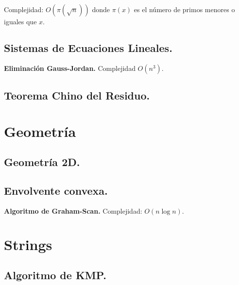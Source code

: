 \documentclass[10pt, letterpaper, twoside]{article}
\begin{document}
Complejidad: $O\left(\pi\left(\sqrt{n}\right)\right)$ donde $\pi(x)$ es el número de primos menores o iguales que $x$.



\subsection{Sistemas de Ecuaciones Lineales.}

\textbf{Eliminación Gauss-Jordan.} Complejidad $O(n^3)$.



\subsection{Teorema Chino del Residuo.}




\section{Geometría}

\subsection{Geometría 2D.}



\subsection{Envolvente convexa.}

\textbf{Algoritmo de Graham-Scan.} Complejidad: $O(n \log n)$.




\section{Strings}

\subsection{Algoritmo de KMP.}
\end{document}
